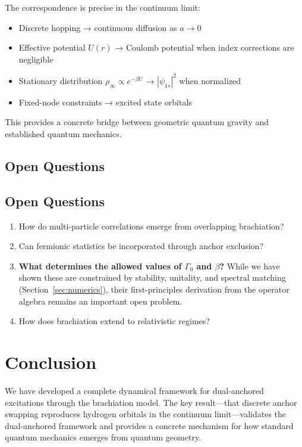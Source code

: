 \documentclass[11pt]{article}
\theoremstyle{plain}
\theoremstyle{definition}
\begin{document}
The correspondence is precise in the continuum limit:
\begin{itemize}
  \item Discrete hopping → continuous diffusion as $a \to 0$
  \item Effective potential $U(r)$ → Coulomb potential when index corrections are negligible
  \item Stationary distribution $\rho_\infty \propto e^{-\beta U}$ → $|\psi_{1s}|^2$ when normalized
  \item Fixed-node constraints → excited state orbitals
\end{itemize}

This provides a concrete bridge between geometric quantum gravity and established quantum mechanics.

\subsection{Open Questions}

\subsection{Open Questions}

\begin{enumerate}
  \item How do multi-particle correlations emerge from overlapping brachiation?
  \item Can fermionic statistics be incorporated through anchor exclusion?
  \item \textbf{What determines the allowed values of $\Gamma_0$ and $\beta$?} While we have shown these are constrained by stability, unitality, and spectral matching (Section~\ref{sec:numerics}), their first-principles derivation from the operator algebra remains an important open problem.
  \item How does brachiation extend to relativistic regimes?
\end{enumerate}
\section{Conclusion}

We have developed a complete dynamical framework for dual-anchored excitations through the brachiation model. The key result—that discrete anchor swapping reproduces hydrogen orbitals in the continuum limit—validates the dual-anchored framework and provides a concrete mechanism for how standard quantum mechanics emerges from quantum geometry.
\end{document}
